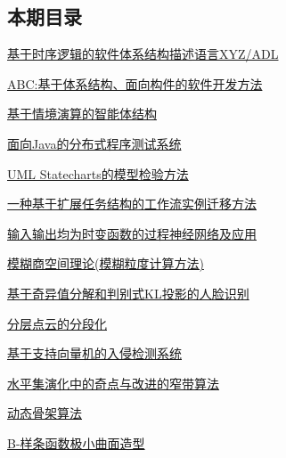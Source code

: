 \documentclass[a4paper]{article}
\begin{document}
\subsection{本期目录}
\href{http://www.jos.org.cn/ch/reader/download_pdf.aspx?file_no=20030401&year_id=2003&quarter_id=4&falg=1}{基于时序逻辑的软件体系结构描述语言XYZ/ADL}

\href{http://www.jos.org.cn/ch/reader/download_pdf.aspx?file_no=20030402&year_id=2003&quarter_id=4&falg=1}{ABC:基于体系结构、面向构件的软件开发方法}

\href{http://www.jos.org.cn/ch/reader/download_pdf.aspx?file_no=20030403&year_id=2003&quarter_id=4&falg=1}{基于情境演算的智能体结构}

\href{http://www.jos.org.cn/ch/reader/download_pdf.aspx?file_no=20030404&year_id=2003&quarter_id=4&falg=1}{面向Java的分布式程序测试系统}

\href{http://www.jos.org.cn/ch/reader/download_pdf.aspx?file_no=20030405&year_id=2003&quarter_id=4&falg=1}{UML Statecharts的模型检验方法}

\href{http://www.jos.org.cn/ch/reader/download_pdf.aspx?file_no=20030406&year_id=2003&quarter_id=4&falg=1}{一种基于扩展任务结构的工作流实例迁移方法}

\href{http://www.jos.org.cn/ch/reader/download_pdf.aspx?file_no=20030407&year_id=2003&quarter_id=4&falg=1}{输入输出均为时变函数的过程神经网络及应用}

\href{http://www.jos.org.cn/ch/reader/download_pdf.aspx?file_no=20030408&year_id=2003&quarter_id=4&falg=1}{模糊商空间理论(模糊粒度计算方法)}

\href{http://www.jos.org.cn/ch/reader/download_pdf.aspx?file_no=20030410&year_id=2003&quarter_id=4&falg=1}{基于奇异值分解和判别式KL投影的人脸识别}

\href{http://www.jos.org.cn/ch/reader/download_pdf.aspx?file_no=20030411&year_id=2003&quarter_id=4&falg=1}{分层点云的分段化}

\href{http://www.jos.org.cn/ch/reader/download_pdf.aspx?file_no=20030412&year_id=2003&quarter_id=4&falg=1}{基于支持向量机的入侵检测系统}

\href{http://www.jos.org.cn/ch/reader/download_pdf.aspx?file_no=20030414&year_id=2003&quarter_id=4&falg=1}{水平集演化中的奇点与改进的窄带算法}

\href{http://www.jos.org.cn/ch/reader/download_pdf.aspx?file_no=20030415&year_id=2003&quarter_id=4&falg=1}{动态骨架算法}

\href{http://www.jos.org.cn/ch/reader/download_pdf.aspx?file_no=20030416&year_id=2003&quarter_id=4&falg=1}{B-样条函数极小曲面造型}
\end{document}

